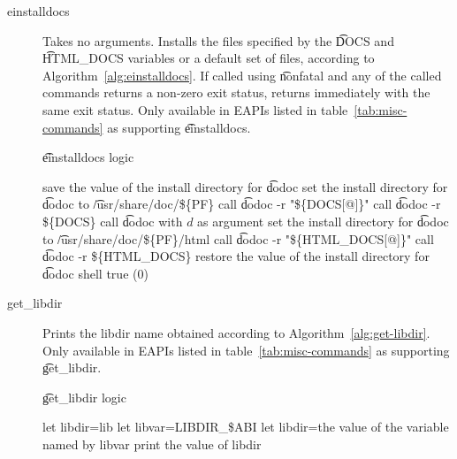 \begin{description}
\item[einstalldocs]  Takes no arguments. Installs the files specified
    by the \t{DOCS} and \t{HTML_DOCS} variables or a default set of files, according to
    Algorithm~\ref{alg:einstalldocs}. If called using \t{nonfatal} and any of the called commands
    returns a non-zero exit status, returns immediately with the same exit status. Only available
    in EAPIs listed in table~\ref{tab:misc-commands} as supporting \t{einstalldocs}.

\begin{algorithm}
\caption{\t{einstalldocs} logic} \label{alg:einstalldocs}
\begin{algorithmic}[1]
\STATE save the value of the install directory for \t{dodoc}
\STATE set the install directory for \t{dodoc} to \t{/usr/share/doc/\$\{PF\}}
    \STATE call \t{dodoc -r "\$\{DOCS[@]\}"}
    \STATE call \t{dodoc -r \$\{DOCS\}}
            \STATE call \t{dodoc} with $d$ as argument
        \ENDIF
    \ENDFOR
\ENDIF
\STATE set the install directory for \t{dodoc} to \t{/usr/share/doc/\$\{PF\}/html}
    \STATE call \t{dodoc -r "\$\{HTML_DOCS[@]\}"}
    \STATE call \t{dodoc -r \$\{HTML_DOCS\}}
\ENDIF
\STATE restore the value of the install directory for \t{dodoc}
\RETURN shell true (0)
\end{algorithmic}
\end{algorithm}

\item[get_libdir]  Prints the libdir name obtained according to
    Algorithm~\ref{alg:get-libdir}. Only available in EAPIs listed in table~\ref{tab:misc-commands}
    as supporting \t{get_libdir}.

\begin{algorithm}
\caption{\t{get_libdir} logic} \label{alg:get-libdir}
\begin{algorithmic}[1]
\STATE let libdir=lib
    \STATE let libvar=LIBDIR_\$ABI
        \STATE let libdir=the value of the variable named by libvar
    \ENDIF
\ENDIF
\STATE print the value of libdir
\end{algorithmic}
\end{algorithm}

\end{description}

